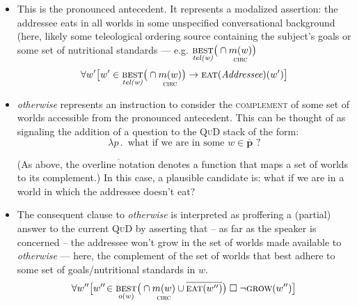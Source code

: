\begin{itemize}%
	\item[ {\makebox[2.5em][r]{$ m_i $}} ] This is the pronounced antecedent. It represents a modalized assertion: the addressee eats in all worlds in some unspecified conversational background (here, likely some teleological ordering source containing the subject's goals or some set of nutritional standards --- e.g. $ \underset{\textit{tel(w)}}{\textsc{best}}\big(\cap\underset{\textsc{circ}}{m(w)}\big)  $
	$$\forall w'\big[w'\in\underset{\textit{tel(w)}}{\textsc{best}}\big(\cap\underset{\textsc{circ}}{m(w)}\big) \to \textsc{eat}(\textit{Addressee})(w')\big]$$
	\item[ {  \makebox[2.5em][r]{$ m_j $}} ]\textit{otherwise} represents an instruction to consider the \textsc{complement} of some set of worlds accessible from the pronounced antecedent. This can be thought of as signaling the addition of a question to the \textsc{QuD} stack of the form: $$
	\lambda p\,.\,\text{ what if we are in some } w\in\overline{\boldsymbol p}\text{ ?}$$
	
	(As above, the $ \overline{\text{overline notation}} $ denotes a function that maps a set of worlds to its complement.) In this case, a plausible candidate is: what if we are in a world in which the addressee doesn't eat?
	
	\item[ {  \makebox[2.5em][r]{$ m_k $}} ] The consequent clause to \textit{otherwise} is interpreted as proffering a (partial) answer to the current \textsc{QuD} by asserting  that -- as far as the speaker is concerned -- the addressee won't grow in the set of worlds made available to \textit{otherwise} --- here, the complement of the set of worlds that best adhere to some set of goals/nutritional standards in $ w $.
	$$\forall w^{\prime\prime}\big[w''\!\in\underset{o(w)}{\textsc{best}}\big(\cap \underset{\textsc{circ}}{m(w)}\cup\overline{\textsc{eat}(w^{\prime\prime})}\big)\;\square\;\neg\textsc{grow}(w^{\prime\prime})\big]$$
	
\end{itemize}


